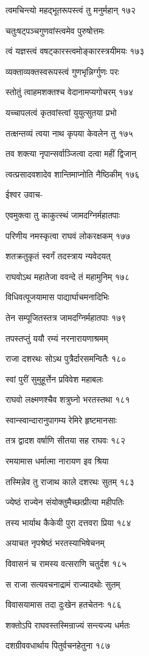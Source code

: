 त्वमचिन्त्यो महद्भूतरूपस्त्वं तु मनुर्महान् १७२

चतुःषट्पञ्चगुणवांस्त्वमेव पुरुषोत्तमः

त्वं यज्ञस्त्वं वषट्कारस्त्वमोङ्कारस्त्रयीमयः १७३

व्यक्ताव्यक्तस्वरूपस्त्वं गुणभृन्निर्ग्गुणः परः

स्तोतुं त्वाहमशक्तश्च वेदानामप्यगोचरम् १७४

यच्चापलत्वं कृतवांस्त्वां युयुत्सुतया प्रभो

तत्क्षन्तव्यं त्वया नाथ कृपया केवलेन तु १७५

तव शक्त्या नृपान्सर्वाञ्जित्वा दत्वा महीं द्विजान्

त्वत्प्रसादवशादेव शान्तिमाप्नोति नैष्ठिकीम् १७६

ईश्वर उवाच-

एवमुक्त्वा तु काकुत्स्थं जामदग्निर्महातपाः

परिणीय नमस्कृत्वा राघवं लोकरक्षकम् १७७

शतक्रतुकृतं स्वर्गं तदस्त्राय न्यवेदयत्

राघवोऽथ महातेजा ववन्दे तं महामुनिम् १७८

विधिवत्पूजयामास पाद्यार्घाचमनादिभिः

तेन सम्पूजितस्तत्र जामदग्निर्महातपाः १७९

तपस्तप्तुं ययौ रम्यं नरनारायणाश्रमम्

राजा दशरथः सोऽथ पुत्रैर्दारसमन्वितैः १८०

स्वां पुरीं सुमुहूर्त्तेन प्रविवेश महाबलः

राघवो लक्ष्मणश्चैव शत्रुघ्नो भरतस्तथा १८१

स्वान्स्वान्दारानुपागम्य रेमिरे हृष्टमानसाः

तत्र द्वादश वर्षाणि सीतया सह राघवः १८२

रमयामास धर्मात्मा नारायण इव श्रिया

तस्मिन्नेव तु राजाथ काले दशरथः सुतम् १८३

ज्येष्ठं राज्येन संयोक्तुमैच्छत्प्रीत्या महीपतिः

तस्य भार्याथ कैकेयी पुरा दत्तवरा प्रिया १८४

अयाचत नृपश्रेष्ठं भरतस्याभिषेचनम्

विवासनं च रामस्य वत्सराणि चतुर्दश १८५

स राजा सत्यवचनाद्रामं राज्यादथोः सुतम्

विवासयामास तदा दुःखेन हतचेतनः १८६

शक्तोऽपि राघवस्तस्मिन्राज्यं सन्त्यज्य धर्मतः

दशग्रीववधार्थाय पितुर्वचनहेतुना १८७

